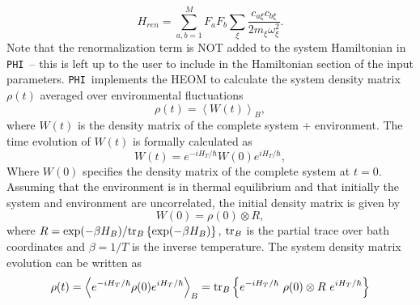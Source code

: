 \documentclass[11pt]{article}
\newcommand{\PHI}{\texttt{PHI}}
\newcommand{\tr}{{\rm tr} }
\begin{document}
\begin{equation}
H_{ren} = \sum_{a,b=1}^M F_{a} F_{b} \sum_\xi \frac{c_{a\xi} c_{b\xi}}{2 m_\xi \omega_\xi^2}.
\end{equation}
Note that the renormalization term is NOT added to the system Hamiltonian in \PHI\ -- this is left up to the user to include in the Hamiltonian section of the input parameters.
\PHI\ implements the HEOM to calculate the system density matrix $\rho(t)$ averaged over environmental fluctuations
\begin{equation}
\rho(t) = \left< W(t) \right>_B,
\end{equation}
where $W(t)$ is the density matrix of the complete system + environment. The time evolution of $W(t)$ is formally calculated as
\begin{equation}
W(t) = e^{- i H_T / \hbar } W(0) e^{i H_T / \hbar },
\end{equation}
Where $W(0)$ specifies the density matrix of the complete system at $t=0$. Assuming that the environment is in thermal equilibrium and that initially the  system and environment are uncorrelated, the initial density matrix is given by
\begin{equation} 
W(0) = \rho(0)\otimes R,
\end{equation}
where $R = \exp(-\beta H_B)/\tr_B\left\{{\exp(-\beta H_B)}\right\}$, $\tr_B$ is the partial trace over bath coordinates and $\beta=1/T$ is the inverse temperature. The system density matrix evolution can be written as
\begin{equation}
\rho(t) = \left< e^{- i H_T / \hbar }  \rho(0) e^{i H_T / \hbar } \right>_B = \tr_B \left\{ e^{- i H_T / \hbar }\ \rho(0)\otimes R\ e^{i H_T / \hbar } \right\}
\end{equation}
\end{document}
